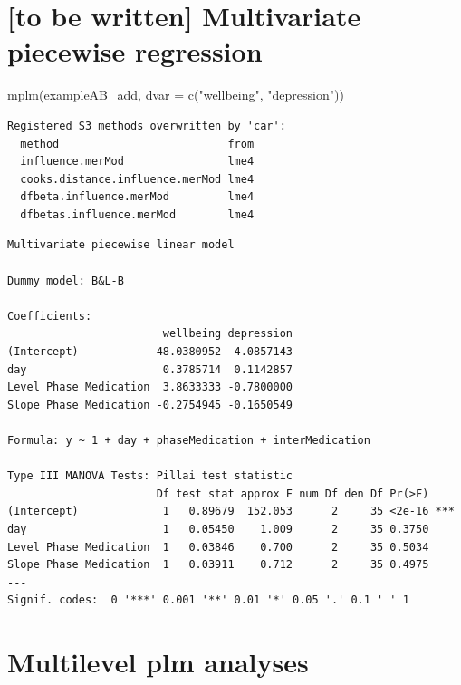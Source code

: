 \documentclass[
]{book}
\newenvironment{Shaded}{\begin{snugshade}}{\end{snugshade}}
\newcommand{\AttributeTok}[1]{\textcolor[rgb]{0.77,0.63,0.00}{#1}}
\newcommand{\FunctionTok}[1]{\textcolor[rgb]{0.00,0.00,0.00}{#1}}
\newcommand{\NormalTok}[1]{#1}
\newcommand{\StringTok}[1]{\textcolor[rgb]{0.31,0.60,0.02}{#1}}
\begin{document}
\hypertarget{to-be-written-multivariate-piecewise-regression}{%
\section{{[}to be written{]} Multivariate piecewise regression}\label{to-be-written-multivariate-piecewise-regression}}

\begin{Shaded}
\begin{Highlighting}[]
\FunctionTok{mplm}\NormalTok{(exampleAB\_add, }\AttributeTok{dvar =} \FunctionTok{c}\NormalTok{(}\StringTok{"wellbeing"}\NormalTok{, }\StringTok{"depression"}\NormalTok{))}
\end{Highlighting}
\end{Shaded}

\begin{verbatim}
Registered S3 methods overwritten by 'car':
  method                          from
  influence.merMod                lme4
  cooks.distance.influence.merMod lme4
  dfbeta.influence.merMod         lme4
  dfbetas.influence.merMod        lme4
\end{verbatim}

\begin{verbatim}
Multivariate piecewise linear model

Dummy model: B&L-B 

Coefficients: 
                        wellbeing depression
(Intercept)            48.0380952  4.0857143
day                     0.3785714  0.1142857
Level Phase Medication  3.8633333 -0.7800000
Slope Phase Medication -0.2754945 -0.1650549

Formula: y ~ 1 + day + phaseMedication + interMedication

Type III MANOVA Tests: Pillai test statistic
                       Df test stat approx F num Df den Df Pr(>F)    
(Intercept)             1   0.89679  152.053      2     35 <2e-16 ***
day                     1   0.05450    1.009      2     35 0.3750    
Level Phase Medication  1   0.03846    0.700      2     35 0.5034    
Slope Phase Medication  1   0.03911    0.712      2     35 0.4975    
---
Signif. codes:  0 '***' 0.001 '**' 0.01 '*' 0.05 '.' 0.1 ' ' 1
\end{verbatim}

\hypertarget{multilevel-plm-analyses}{%
\section{Multilevel plm analyses}\label{multilevel-plm-analyses}}
\end{document}
